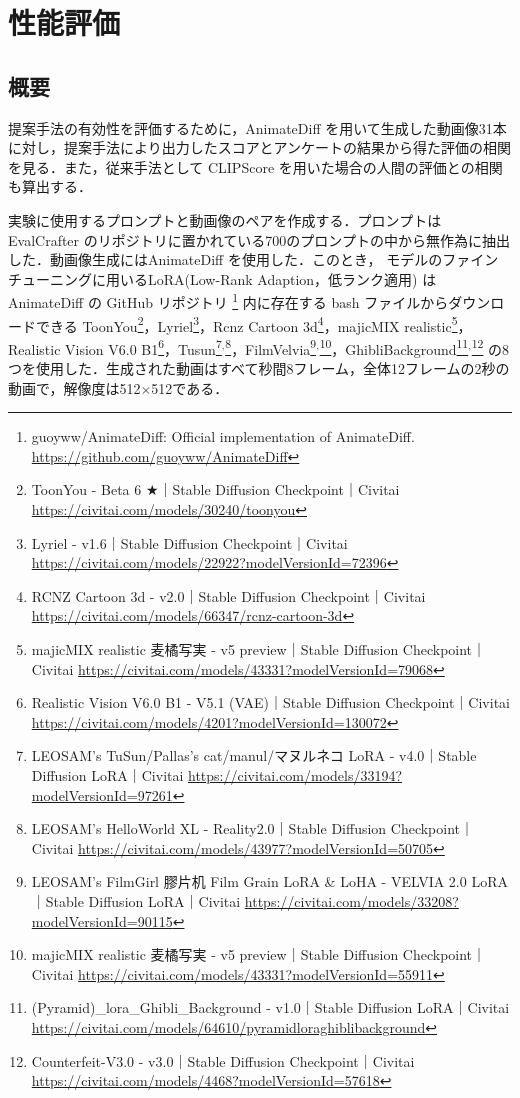 \documentclass[11pt,a4j]{jreport}
\begin{document}
\chapter{性能評価}
\label{experiment}
\section{概要}

提案手法の有効性を評価するために，AnimateDiff を用いて生成した動画像31本に対し，提案手法により出力したスコアとアンケートの結果から得た評価の相関を見る．また，従来手法として CLIPScore \cite{hessel2021clipscore} を用いた場合の人間の評価との相関も算出する．

実験に使用するプロンプトと動画像のペアを作成する．プロンプトは EvalCrafter \cite{liu2023evalcrafter} のリポジトリに置かれている700のプロンプトの中から無作為に抽出した．動画像生成にはAnimateDiff \cite{guo2023animatediff} を使用した．このとき， モデルのファインチューニングに用いるLoRA(Low-Rank Adaption，低ランク適用) \cite{hu2021lora} は AnimateDiff の GitHub リポジトリ \footnote{guoyww/AnimateDiff: Official implementation of AnimateDiff. \url{https://github.com/guoyww/AnimateDiff}} 内に存在する bash ファイルからダウンロードできる ToonYou\footnote{ToonYou - Beta 6 ★｜Stable Diffusion Checkpoint｜Civitai \url{https://civitai.com/models/30240/toonyou}}，Lyriel\footnote{Lyriel - v1.6｜Stable Diffusion Checkpoint｜Civitai \url{https://civitai.com/models/22922?modelVersionId=72396}}，Rcnz Cartoon 3d\footnote{RCNZ Cartoon 3d - v2.0｜Stable Diffusion Checkpoint｜Civitai \url{https://civitai.com/models/66347/rcnz-cartoon-3d}}，majicMIX realistic\footnote{majicMIX realistic 麦橘写実 - v5 preview｜Stable Diffusion Checkpoint｜Civitai \url{https://civitai.com/models/43331?modelVersionId=79068}}，Realistic Vision V6.0 B1\footnote{Realistic Vision V6.0 B1 - V5.1 (VAE)｜Stable Diffusion Checkpoint｜Civitai \url{https://civitai.com/models/4201?modelVersionId=130072}}，Tusun\footnote{LEOSAM's TuSun/Pallas's cat/manul/マヌルネコ LoRA - v4.0｜Stable Diffusion LoRA｜Civitai \url{https://civitai.com/models/33194?modelVersionId=97261}}$^,$\footnote{LEOSAM's HelloWorld XL - Reality2.0｜Stable Diffusion Checkpoint｜Civitai \url{https://civitai.com/models/43977?modelVersionId=50705}}，FilmVelvia\footnote{LEOSAM's FilmGirl 膠片机 Film Grain LoRA \& LoHA - VELVIA 2.0 LoRA｜Stable Diffusion LoRA｜Civitai \url{https://civitai.com/models/33208?modelVersionId=90115}}$^,$\footnote{majicMIX realistic 麦橘写実 - v5 preview｜Stable Diffusion Checkpoint｜Civitai \url{https://civitai.com/models/43331?modelVersionId=55911}}，GhibliBackground\footnote{(Pyramid)_lora_Ghibli_Background - v1.0｜Stable Diffusion LoRA｜Civitai \url{https://civitai.com/models/64610/pyramidloraghiblibackground}}$^,$\footnote{Counterfeit-V3.0 - v3.0｜Stable Diffusion Checkpoint｜Civitai \url{https://civitai.com/models/4468?modelVersionId=57618}} の8つを使用した．生成された動画はすべて秒間8フレーム，全体12フレームの2秒の動画で，解像度は512$\times$512である．
\end{document}
